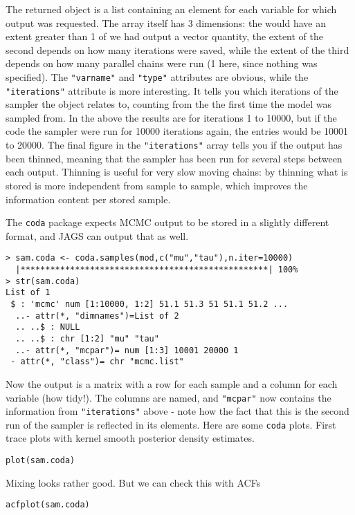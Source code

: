 \documentclass[10pt] {article}
\newcommand{\eps}[3]
{{\begin{center}
 \rotatebox{#1}{\scalebox{#2}{\texttt{[image: \#3]}}}
 \end{center}}
}
\theoremstyle{definition}
\begin{document}
The returned object is a list containing an element for each variable for which output was requested. The array itself has 3 dimensions: the would have an extent greater than 1 of we had output a vector quantity, the extent of the second depends on how many iterations were saved, while the extent of the third depends on how many parallel chains were run (1 here, since nothing was specified). The \lstinline+"varname"+ and \lstinline+"type"+ attributes are obvious, while the \lstinline+"iterations"+ attribute is more interesting. It tells you which iterations of the sampler the object relates to, counting from the the first time the model was sampled from. In the above the results are for iterations 1 to 10000, but if the code the sampler were run for 10000 iterations again, the entries would be 10001 to 20000. The final figure in the \lstinline+"iterations"+ array tells you if the output has been thinned, meaning that the sampler has been run for several steps between each output. Thinning is useful for very slow moving chains: by thinning what is stored is more independent from sample to sample, which improves the information content per stored sample. 

The {\tt coda} package expects MCMC output to be stored in a slightly different format, and JAGS can output that as well. 
\begin{lstlisting}
> sam.coda <- coda.samples(mod,c("mu","tau"),n.iter=10000)
  |**************************************************| 100%
> str(sam.coda)
List of 1
 $ : 'mcmc' num [1:10000, 1:2] 51.1 51.3 51 51.1 51.2 ...
  ..- attr(*, "dimnames")=List of 2
  .. ..$ : NULL
  .. ..$ : chr [1:2] "mu" "tau"
  ..- attr(*, "mcpar")= num [1:3] 10001 20000 1
 - attr(*, "class")= chr "mcmc.list"
\end{lstlisting}
Now the output is a matrix with a row for each sample and a column for each variable (how tidy!). The columns are named, and \lstinline+"mcpar"+ now contains the information from   \lstinline+"iterations"+ above - note how the fact that this is the second run of the sampler is reflected in its elements. Here are some {\tt coda} plots. First trace plots with kernel smooth posterior density estimates. 
\begin{lstlisting}
plot(sam.coda)
\end{lstlisting}
\eps{-90}{.4}{coda-trace.eps}
Mixing looks rather good. But we can check this with ACFs
\begin{lstlisting}
acfplot(sam.coda)
\end{lstlisting}
\end{document}
